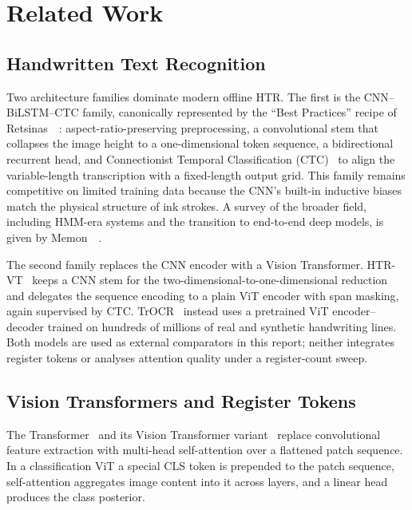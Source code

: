 \section{Related Work}
\label{sec:related_work}

\subsection{Handwritten Text Recognition}
\label{sec:rw_htr}

Two architecture families dominate modern offline HTR. The first is the CNN--BiLSTM--CTC family, canonically represented by the ``Best Practices'' recipe of Retsinas~\etal~\cite{retsinas2022htrbestpractices}: aspect-ratio-preserving preprocessing, a convolutional stem that collapses the image height to a one-dimensional token sequence, a bidirectional recurrent head, and Connectionist Temporal Classification (CTC)~\cite{graves2006ctc} to align the variable-length transcription with a fixed-length output grid. This family remains competitive on limited training data because the CNN's built-in inductive biases match the physical structure of ink strokes. A survey of the broader field, including HMM-era systems and the transition to end-to-end deep models, is given by Memon~\etal~\cite{memon2020htrsurvey}.

The second family replaces the CNN encoder with a Vision Transformer. HTR-VT~\cite{li2024htrvt} keeps a CNN stem for the two-dimensional-to-one-dimensional reduction and delegates the sequence encoding to a plain ViT encoder with span masking, again supervised by CTC. TrOCR~\cite{li2023trocr} instead uses a pretrained ViT encoder--decoder trained on hundreds of millions of real and synthetic handwriting lines. Both models are used as external comparators in this report; neither integrates register tokens or analyses attention quality under a register-count sweep.

\subsection{Vision Transformers and Register Tokens}
\label{sec:rw_registers}

The Transformer~\cite{vaswani2017attention} and its Vision Transformer variant~\cite{dosovitskiy2021vit} replace convolutional feature extraction with multi-head self-attention over a flattened patch sequence. In a classification ViT a special CLS token is prepended to the patch sequence, self-attention aggregates image content into it across layers, and a linear head produces the class posterior.

